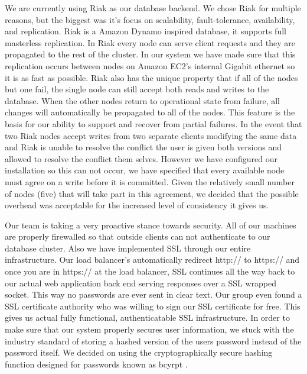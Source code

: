 \documentclass{dependencies/acm_proc_article-sp}
\begin{document}
We are currently using Riak as our database backend. We chose Riak for multiple
reasons, but the biggest was it's focus on  scalability, fault-tolerance,
availability, and replication. Riak is a Amazon Dynamo \cite{dynamo} inspired
database, it supports full masterless replication. In Riak every node can
serve client requests and they are propagated to the rest of the cluster.
In our system we have made sure that this replication occurs between nodes
on Amazon EC2's internal Gigabit ethernet so it is as fast as possible. Riak
also has the unique property that if all of the nodes but one fail, the single
node can still accept both reads and writes to the database. When the other
nodes return to operational state from failure, all changes will automatically
be propagated to all of the nodes. This feature is the basis for our ability to
support and recover from partial failures. In the event that two Riak nodes accept
writes from two separate clients modifying the same data and Riak is unable
to resolve the conflict the user is given both versions and allowed to resolve
the conflict them selves. However we have configured our installation so this
can not occur, we have specified that every available node must agree on a
write before it is committed. Given the relatively small number of nodes (five)
that will take part in this agreement, we decided that the possible overhead
was acceptable for the increased level of consistency it gives us.

Our team is taking a very proactive stance towards security. All of our machines are properly firewalled so that
outside clients can not authenticate to our database cluster. Also we have implemented SSL through our entire infrastructure.
Our load balancer's automatically redirect http:// to https:// and once you are in https:// at the load balancer, SSL continues all the
way back to our actual web application back end serving responses over a SSL wrapped socket. This way no passwords are ever
sent in clear text. Our group even found a SSL certificate authority who was willing to sign our SSL certificate for free. This gives
us actual fully functional, authenticatable SSL infrastructure. In order to make sure that our system properly secures user information,
we stuck with the industry standard of storing a hashed version of the users password instead of the password itself. We decided on using
the cryptographically secure hashing function designed for passwords known as bcyrpt \cite{bcrypt}.

\newpage
%

%
%
\balancecolumns
\end{document}
